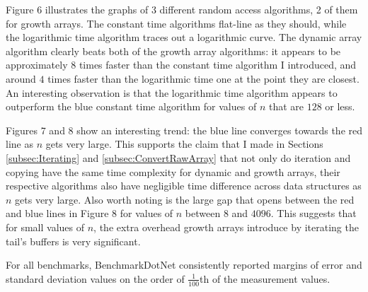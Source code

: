 Figure 6 illustrates the graphs of 3 different random access algorithms, 2 of them for growth arrays. The constant time algorithms flat-line as they should, while the logarithmic time algorithm traces out a logarithmic curve. The dynamic array algorithm clearly beats both of the growth array algorithms: it appears to be approximately $8$ times faster than the constant time algorithm I introduced, and around $4$ times faster than the logarithmic time one at the point they are closest. An interesting observation is that the logarithmic time algorithm appears to outperform the blue constant time algorithm for values of $n$ that are $128$ or less.

Figures 7 and 8 show an interesting trend: the blue line converges towards the red line as $n$ gets very large. This supports the claim that I made in Sections \ref{subsec:Iterating} and \ref{subsec:ConvertRawArray} that not only do iteration and copying have the same time complexity for dynamic and growth arrays, their respective algorithms also have negligible time difference across data structures as $n$ gets very large. Also worth noting is the large gap that opens between the red and blue lines in Figure 8 for values of $n$ between $8$ and $4096$. This suggests that for small values of $n$, the extra overhead growth arrays introduce by iterating the tail's buffers is very significant.

For all benchmarks, BenchmarkDotNet consistently reported margins of error and standard deviation values on the order of $\frac{1}{100}$th of the measurement values.
